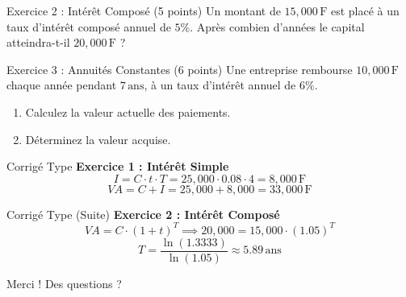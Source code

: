 \documentclass{beamer}
\begin{document}
\begin{frame}{Exercice 2 : Intérêt Composé (5 points)}
Un montant de \( 15,000 \, \text{F} \) est placé à un taux d’intérêt composé annuel de \( 5\% \). Après combien d’années le capital atteindra-t-il \( 20,000 \, \text{F} \) ?
\end{frame}

\begin{frame}{Exercice 3 : Annuités Constantes (6 points)}
Une entreprise rembourse \( 10,000 \, \text{F} \) chaque année pendant \( 7 \, \text{ans} \), à un taux d’intérêt annuel de \( 6\% \).
\begin{enumerate}
    \item Calculez la valeur actuelle des paiements.
    \item Déterminez la valeur acquise.
\end{enumerate}
\end{frame}

\begin{frame}{Corrigé Type}
\textbf{Exercice 1 : Intérêt Simple} \\
\[
I = C \cdot t \cdot T = 25,000 \cdot 0.08 \cdot 4 = 8,000 \, \text{F}
\]
\[
VA = C + I = 25,000 + 8,000 = 33,000 \, \text{F}
\]
\end{frame}

\begin{frame}{Corrigé Type (Suite)}
\textbf{Exercice 2 : Intérêt Composé} \\
\[
VA = C \cdot (1 + t)^T \implies 20,000 = 15,000 \cdot (1.05)^T
\]
\[
T = \frac{\ln(1.3333)}{\ln(1.05)} \approx 5.89 \, \text{ans}
\]
\end{frame}

\begin{frame}{Merci !}
    \centering
    \Huge Des questions ?
\end{frame}
\end{document}
